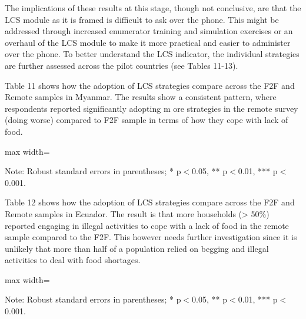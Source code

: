 \documentclass[11pt,harvard]{article}
\begin{document}
The implications of these results at this stage, though not conclusive, are that the LCS module as it is framed is difficult to ask over the phone. This might be addressed through increased enumerator training and simulation exercises or an overhaul of the LCS module to make it more practical and easier to administer over the phone.
To better understand the LCS indicator, the individual strategies are further assessed across the pilot countries (see Tables 11-13).
 
Table 11 shows how the adoption of LCS strategies compare across the F2F and Remote samples in Myanmar. The results show a consistent pattern, where respondents reported significantly adopting m ore strategies in the remote survey (doing worse) compared to F2F sample in terms of how they cope with lack of food.
	
	\begin{table}[htbp]
		\centering
		\begin{adjustbox}{max width=\textwidth}
			\begin{threeparttable}
				\caption{Myanmar: Each Coping Strategy Used}
				\scriptsize
				 
				\label{tab:LCS_Ind_Modality_Myanmar}
				\begin{tablenotes}
					\item Note: Robust standard errors in parentheses; * p$<$0.05, ** p$<$0.01, *** p$<$0.001. 
				\end{tablenotes}
			\end{threeparttable}
		\end{adjustbox}
	\end{table}
	

Table 12 shows how the adoption of LCS strategies compare across the F2F and Remote samples in Ecuador. The result is that more households (> 50\%) reported engaging in illegal activities to cope with a lack of food in the remote sample compared to the F2F. This however needs further investigation since it is unlikely that more than half of a population relied on begging and illegal activities  to deal with food shortages.
	
	\begin{table}[htbp]
		\centering
		\begin{adjustbox}{max width=\textwidth}
			\begin{threeparttable}
				\caption{Ecuador: Each Coping Strategy Used}
				\scriptsize
				 
				\label{tab:LCS_Ind_Modality_Ecuador}
				\begin{tablenotes}
					\item Note: Robust standard errors in parentheses; * p$<$0.05, ** p$<$0.01, *** p$<$0.001. 
				\end{tablenotes}
			\end{threeparttable}
		\end{adjustbox}
	\end{table}
	
\end{document}
